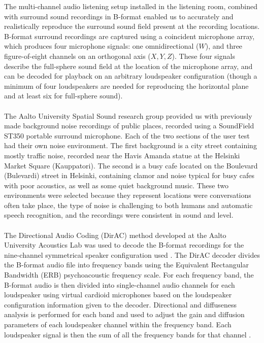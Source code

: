 \documentclass[english, 12pt, a4paper, pdftex, elec, utf8]{aaltothesis}
\begin{document}
The multi-channel audio listening setup installed in the listening room, combined with surround sound recordings in B-format enabled us to accurately and realistically reproduce the surround sound field present at the recording locations. B-format surround recordings are captured using a coincident microphone array, which produces four microphone signals: one omnidirectional ($W$), and three figure-of-eight channels on an orthogonal axis ($X,Y,Z$). These four signals describe the full-sphere sound field at the location of the microphone array, and can be decoded for playback on an arbitrary loudspeaker configuration (though a minimum of four loudspeakers are needed for reproducing the horizontal plane and at least six for full-sphere sound). \cite{furness1990ambisonics, pulkki2015communication} \\\\
The Aalto University Spatial Sound research group provided us with previously made background noise recordings of public places, recorded using a SoundField ST350 portable surround microphone. Each of the two sections of the user test had their own noise environment. The first background is a city street containing mostly traffic noise, recorded near the Havis Amanda statue at the Helsinki Market Square (Kauppatori). The second is a busy cafe located on the Boulevard (Bulevardi) street in Helsinki, containing clamor and noise typical for busy cafes with poor acoustics, as well as some quiet background music. These two environments were selected because they represent locations were conversations often take place, the type of noise is challenging to both humans and automatic speech recognition, and the recordings were consistent in sound and level. \\\\ 
The Directional Audio Coding (DirAC) method developed at the Aalto University Acoustics Lab was used to decode the B-format recordings for the nine-channel symmetrical speaker configuration used \cite{pulkki2015communication, pulkki2006directional}. The DirAC decoder divides the B-format audio file into frequency bands using the Equivalent Rectangular Bandwidth (ERB) psychoacoustic frequency scale. For each frequency band, the B-format audio is then divided into single-channel audio channels for each loudspeaker using virtual cardioid microphones based on the loudspeaker configuration information given to the decoder. Directional and diffuseness analysis is performed for each band and used to adjust the gain and diffusion parameters of each loudspeaker channel within the frequency band. Each loudspeaker signal is then the sum of all the frequency bands for that channel \cite{pulkki2006directional}. \\\\
\end{document}
